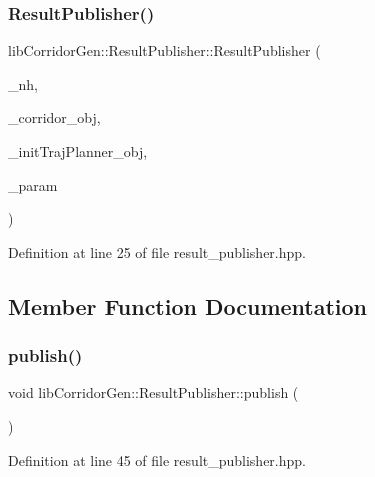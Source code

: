 \subsubsection{\texorpdfstring{Result\+Publisher()}{ResultPublisher()}}
{\footnotesize\ttfamily lib\+Corridor\+Gen\+::\+Result\+Publisher\+::\+Result\+Publisher (\begin{DoxyParamCaption}\item[{const ros\+::\+Node\+Handle \&}]{\+\_\+nh,  }\item[{std\+::shared\+\_\+ptr$<$ \hyperlink{classlib_corridor_gen_1_1_corridor}{Corridor} $>$}]{\+\_\+corridor\+\_\+obj,  }\item[{std\+::shared\+\_\+ptr$<$ \hyperlink{classlib_corridor_gen_1_1_init_traj_planner}{Init\+Traj\+Planner} $>$}]{\+\_\+init\+Traj\+Planner\+\_\+obj,  }\item[{\hyperlink{classlib_corridor_gen_1_1_param}{Param}}]{\+\_\+param }\end{DoxyParamCaption})\hspace{0.3cm}{\ttfamily [inline]}}



Definition at line 25 of file result\+\_\+publisher.\+hpp.



\subsection{Member Function Documentation}
\mbox{\label{classlib_corridor_gen_1_1_result_publisher_a846ddb44d304b996236505af060c760d}} 
\subsubsection{\texorpdfstring{publish()}{publish()}}
{\footnotesize\ttfamily void lib\+Corridor\+Gen\+::\+Result\+Publisher\+::publish (\begin{DoxyParamCaption}{ }\end{DoxyParamCaption})\hspace{0.3cm}{\ttfamily [inline]}}



Definition at line 45 of file result\+\_\+publisher.\+hpp.

